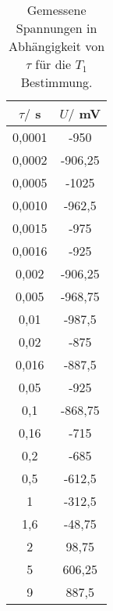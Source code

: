 \begin{table}[!htp]
\centering
\caption{Gemessene Spannungen in Abhängigkeit von $\tau$ für die $T_1$ Bestimmung.}
\label{tab:t1}
\begin{tabular}{c c}
\toprule
{$\tau /$ s} & {$U /$ mV} \\
\midrule
0,0001 & -950 \\
0,0002 & -906,25 \\
0,0005 & -1025 \\
0,0010 & -962,5 \\
0,0015 & -975 \\
0,0016 & -925 \\
0,002 & -906,25 \\
0,005 & -968,75 \\
0,01 & -987,5 \\
0,02 & -875 \\
0,016 & -887,5 \\
0,05 & -925 \\
0,1 & -868,75 \\
0,16 & -715 \\
0,2 & -685 \\
0,5 & -612,5 \\
1 & -312,5 \\
1,6 & -48,75 \\
2 & 98,75 \\
5 & 606,25 \\
9 & 887,5 \\
\bottomrule
\end{tabular}
\end{table}